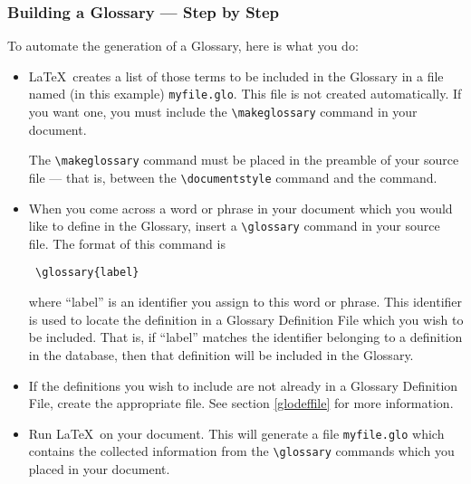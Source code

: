 \subsubsection{Building a Glossary --- Step by Step}

To automate the generation of a Glossary, here is what you do: 

\begin{itemize}

\item \LaTeX\ creates a list of those terms to be included in the Glossary in a
file named (in this example) {\tt myfile.glo}. This file is not created
automatically.  If you want one, you must include the \verb+\makeglossary+
command in your document. 

The \verb+\makeglossary+ command must be placed in the preamble of your source 
file --- that is, between the \verb+\documentstyle+ command and the
\verb++ command.

 

\item When you come across a word or phrase in your document which you would
like to define in the Glossary, insert a \verb+\glossary+ command in your
source file. The format of this command is  \begin{verbatim} \glossary{label}
\end{verbatim} where ``label'' is an identifier you assign to this word or
phrase.  This identifier is used to locate the definition in a Glossary
Definition File which you wish to be included.  That is, if ``label'' matches
the identifier belonging to a definition in the database, then that definition
will be included in the Glossary.


\item If the definitions you wish to include are not already in a Glossary
Definition File, create the appropriate file.  See section \ref{glodeffile}
for more information.

\item Run \LaTeX\ on your document.  This
will generate a file {\tt myfile.glo} which contains the collected information
from the \verb+\glossary+ commands which you placed in your document. 


                                                                           


\end{itemize}
